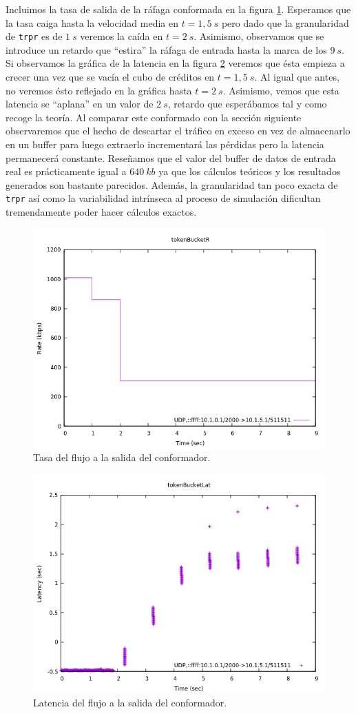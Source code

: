 \documentclass[11pt]{article}
\begin{document}
            Incluimos la tasa de salida de la ráfaga conformada en la figura \ref{fig:tokenBucketR}. Esperamos que la tasa caiga hasta la velocidad media en $t = 1,5\ s$ pero dado que la granularidad de \texttt{trpr} es de $1\ s$ veremos la caída en $t = 2\ s$. Asimismo, observamos que se introduce un retardo que ``estira'' la ráfaga de entrada hasta la marca de los $9\ s$. Si observamos la gráfica de la latencia en la figura \ref{fig:tokenBucketLat} veremos que ésta empieza a crecer una vez que se vacía el cubo de créditos en $t = 1,5\ s$. Al igual que antes, no veremos ésto reflejado en la gráfica hasta $t = 2\ s$. Asimismo, vemos que esta latencia se ``aplana'' en un valor de $2\ s$, retardo que esperábamos tal y como recoge la teoría. Al comparar este conformado con la sección siguiente observaremos que el hecho de descartar el tráfico en exceso en vez de almacenarlo en un buffer para luego extraerlo incrementará las pérdidas pero la latencia permanecerá constante. Reseñamos que el valor del buffer de datos de entrada real es prácticamente igual a $640\ kb$ ya que los cálculos teóricos y los resultados generados son bastante parecidos. Además, la granularidad tan poco exacta de \texttt{trpr} así como la variabilidad intrínseca al proceso de simulación dificultan tremendamente poder hacer cálculos exactos.

            \begin{figure}
                \centering
                \includegraphics[width=0.6\linewidth]{tokenBucketR.png}
                \caption{Tasa del flujo a la salida del conformador.}
                \label{fig:tokenBucketR}
            \end{figure}

            \begin{figure}
                \centering
                \includegraphics[width=0.6\linewidth]{tokenBucketLat.png}
                \caption{Latencia del flujo a la salida del conformador.}
                \label{fig:tokenBucketLat}
            \end{figure}
\end{document}
